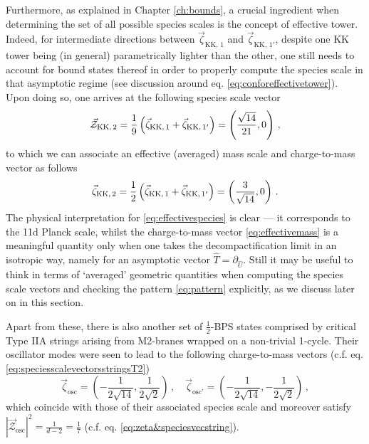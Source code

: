 Furthermore, as explained in Chapter \ref{ch:bounds}, a crucial ingredient when determining the set of all possible species scales is the concept of effective tower. Indeed, for intermediate directions between $\vec{\zeta}_{\text{KK},\, 1}$ and $\vec{\zeta}_{\text{KK},\, 1'}$, despite one KK tower being (in general) parametrically lighter than the other, one still needs to account for bound states thereof in order to properly compute the species scale in that asymptotic regime (see discussion around eq. \eqref{eq:conforeffectivetower}). Upon doing so, one arrives at the following species scale vector
%
\begin{equation}\label{eq:effectivespecies}
	\vec{\mathcal{Z}}_{{\rm KK},\, 2}=\frac{1}{9} \left( \vec{\zeta}_{{\rm KK},\, 1} +\vec{\zeta}_{{\rm KK},\, 1'} \right) = \left( \frac{\sqrt{14}}{21} , 0\right)\, ,
\end{equation}
%
to which we can associate an effective (averaged) mass scale and charge-to-mass vector as follows
%
\begin{equation}\label{eq:effectivemass}
	\vec{\zeta}_{{\rm KK},\,2}=\frac{1}{2} \left( \vec{\zeta}_{{\rm KK},\, 1} +\vec{\zeta}_{{\rm KK},\, 1'} \right) = \left( \frac{3}{\sqrt{14}} , 0\right)\, .
\end{equation}
%
The physical interpretation for \eqref{eq:effectivespecies} is clear --- it corresponds to the 11d Planck scale, whilst the charge-to-mass vector \eqref{eq:effectivemass} is a meaningful quantity only when one takes the decompactification limit in an isotropic way, namely for an asymptotic vector $\hat T = \partial_{\hat U}$. Still it may be useful to think in terms of `averaged' geometric quantities when computing the species scale vectors and checking the pattern \eqref{eq:pattern} explicitly, as we discuss later on in this section.
	
Apart from these, there is also another set of $\frac{1}{2}$-BPS states comprised by critical Type IIA strings arising from M2-branes wrapped on a non-trivial 1-cycle. Their oscillator modes were seen to lead to the following charge-to-mass vectors (c.f. eq. \eqref{eq:speciesscalevectorsstringsT2})
%
\begin{equation}\label{eq:9dstrings}
	\vec{\zeta}_{\text{osc}} = \left( -\frac{1}{2 \sqrt{14}},\frac{1}{2\sqrt{2}} \right) \, , \quad 
	\vec{\zeta}_{\text{osc'}} = \left( -\frac{1}{2 \sqrt{14}},- \frac{1}{2\sqrt{2}} \right) \, ,
\end{equation}
%
which coincide with those of their associated species scale and moreover satisfy $|\vec{\mathcal{Z}}_{\text{osc}}|^2=\frac{1}{d-2}=\frac{1}{7}$ (c.f. eq. \eqref{eq:zeta&speciesvecstring}).

